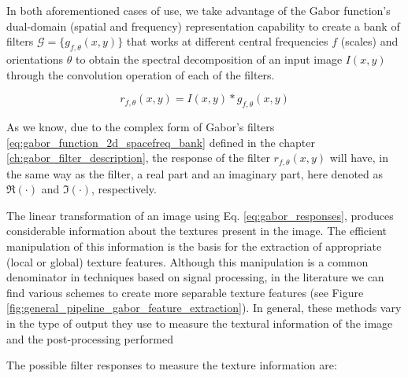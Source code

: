In both aforementioned cases of use, we take advantage of the Gabor function's dual-domain (spatial and frequency) representation capability to create a bank of filters $\mathcal{G}=\{g_{f, \theta}(x, y) \}$ that works at different central frequencies $f$ (scales) and orientations $\theta$ to obtain the spectral decomposition of an input image $I(x, y)$ through the convolution operation of each of the filters. 

\begin{equation}\label{eq:gabor_responses}
    r_{f, \theta}(x,y) = I(x, y) \ast g_{f, \theta}(x,y)
\end{equation}

As we know, due to the complex form of Gabor's filters \ref{eq:gabor_function_2d_spacefreq_bank} defined in the chapter \ref{ch:gabor_filter_description}, the response of the filter $r_{f,\theta} (x, y)$ will have, in the same way as the filter, a real part and an imaginary part, here denoted as $\Re{(\cdot)}$ and $\Im{(\cdot)}$, respectively.

The linear transformation of an image using Eq. \eqref{eq:gabor_responses}, produces considerable information about the textures present in the image. The efficient manipulation of this information is the basis for the extraction of appropriate (local or global) texture features. Although this manipulation is a common denominator in techniques based on signal processing, in the literature we can find various schemes to create more separable texture features (see Figure \ref{fig:general_pipeline_gabor_feature_extraction}). In general, these methods vary in the type of output they use to measure the textural information of the image and the post-processing performed

The possible filter responses to measure the texture information are: 

